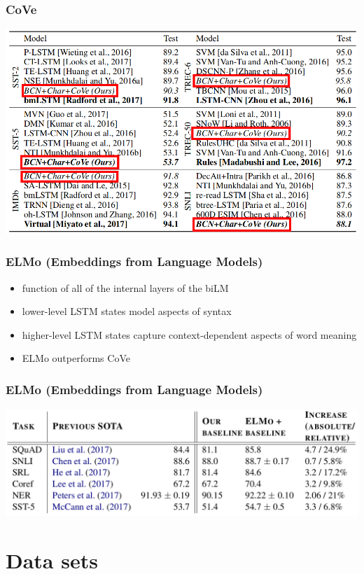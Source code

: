 \documentclass{beamer}
\begin{document}
\begin{frame}
    \frametitle{CoVe}
    \begin{center}
        \includegraphics{img/CoVe-result.png}
    \end{center}
\end{frame}

\begin{frame}
    \frametitle{ELMo (Embeddings from Language Models)}
    \begin{itemize}
        \item function of all of the internal layers of the biLM
        \item lower-level LSTM states model aspects of syntax
        \item higher-level LSTM states capture context-dependent aspects of  word meaning
        \item ELMo outperforms CoVe
    \end{itemize}
\end{frame}

\begin{frame}
    \frametitle{ELMo (Embeddings from Language Models)}
    \begin{center}
        \includegraphics{img/ELmo-result.png}
    \end{center}
\end{frame}

\section{Data sets}
\end{document}

